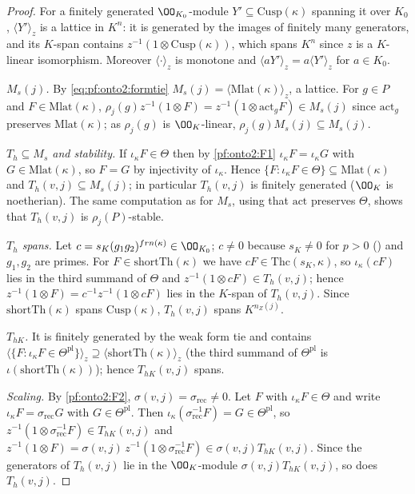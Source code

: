 \begin{proof}
For a finitely generated $\OO_{K_0}$-module $Y'\subseteq\mathrm{Cusp}(\kappa)$ spanning it over $K_0$, $\langle Y'\rangle_z$ is a
lattice in $K^{n}$: it is generated by the images of finitely many generators, and its $K$-span contains
$z^{-1}(1\otimes\mathrm{Cusp}(\kappa))$, which spans $K^n$ since $z$ is a $K$-linear isomorphism. Moreover $\langle\cdot\rangle_z$ is
monotone and $\langle aY'\rangle_z=a\langle Y'\rangle_z$ for $a\in K_0$.

\emph{$M_s(j)$.} By \eqref{eq:pf:onto2:formtie} $M_s(j)=\langle\mathrm{Mlat}(\kappa)\rangle_z$, a lattice. For $g\in P$ and
$F\in\mathrm{Mlat}(\kappa)$, $\rho_j(g)z^{-1}(1\otimes F)=z^{-1}(1\otimes\mathrm{act}_gF)\in M_s(j)$ since $\mathrm{act}_g$ preserves
$\mathrm{Mlat}(\kappa)$; as $\rho_j(g)$ is $\OO_K$-linear, $\rho_j(g)M_s(j)\subseteq M_s(j)$.

\emph{$T_h\subseteq M_s$ and stability.} If $\iota_\kappa F\in\Theta$ then by \ref{pf:onto2:F1} $\iota_\kappa F=\iota_\kappa G$ with
$G\in\mathrm{Mlat}(\kappa)$, so $F=G$ by injectivity of $\iota_\kappa$. Hence $\{F:\iota_\kappa F\in\Theta\}\subseteq\mathrm{Mlat}(\kappa)$
and $T_h(v,j)\subseteq M_s(j)$; in particular $T_h(v,j)$ is finitely generated ($\OO_K$ is noetherian). The same computation as
for $M_s$, using that $\mathrm{act}$ preserves $\Theta$, shows that $T_h(v,j)$ is $\rho_j(P)$-stable.

\emph{$T_h$ spans.} Let $c=s_K(g_1g_2)^{frn(\kappa)}\in\OO_{K_0}$; $c\ne0$ because $s_K\ne0$ for $p>0$
() and $g_1,g_2$ are primes. For $F\in\mathrm{shortTh}(\kappa)$ we have
$cF\in\mathrm{Thc}(s_K,\kappa)$, so $\iota_\kappa(cF)$ lies in the third summand of $\Theta$ and $z^{-1}(1\otimes cF)\in T_h(v,j)$;
hence $z^{-1}(1\otimes F)=c^{-1}z^{-1}(1\otimes cF)$ lies in the $K$-span of $T_h(v,j)$. Since $\mathrm{shortTh}(\kappa)$ spans
$\mathrm{Cusp}(\kappa)$, $T_h(v,j)$ spans $K^{n_Z(j)}$.

\emph{$T_{hK}$.} It is finitely generated by the weak form tie and contains
$\langle\{F:\iota_\kappa F\in\Theta^{\mathrm{pl}}\}\rangle_z\supseteq\langle\mathrm{shortTh}(\kappa)\rangle_z$ (the third summand of
$\Theta^{\mathrm{pl}}$ is $\iota(\mathrm{shortTh}(\kappa))$); hence $T_{hK}(v,j)$ spans.

\emph{Scaling.} By \ref{pf:onto2:F2}, $\sigma(v,j)=\sigma_{\mathrm{rec}}\ne0$. Let $F$ with $\iota_\kappa F\in\Theta$ and write
$\iota_\kappa F=\sigma_{\mathrm{rec}}G$ with $G\in\Theta^{\mathrm{pl}}$. Then $\iota_\kappa(\sigma_{\mathrm{rec}}^{-1}F)=G\in\Theta^{\mathrm{pl}}$,
so $z^{-1}(1\otimes\sigma_{\mathrm{rec}}^{-1}F)\in T_{hK}(v,j)$ and $z^{-1}(1\otimes F)=\sigma(v,j)\,z^{-1}(1\otimes\sigma_{\mathrm{rec}}^{-1}F)\in
\sigma(v,j)T_{hK}(v,j)$. Since the generators of $T_h(v,j)$ lie in the $\OO_K$-module $\sigma(v,j)T_{hK}(v,j)$, so does $T_h(v,j)$.
\end{proof}

